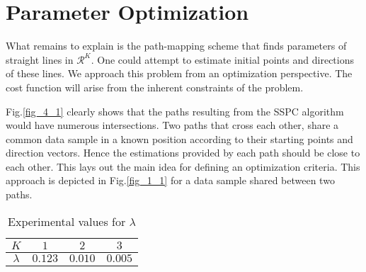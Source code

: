 \documentclass[10pt,journal,cspaper,compsoc]{IEEEtran}
\let\MYoriglatexcaption\caption
\renewcommand{\caption}[2][\relax]{\MYoriglatexcaption[#2]{#2}}
\begin{document}
\section{Parameter Optimization}
What remains to explain is the path-mapping scheme that finds parameters of straight lines in  $\mathcal{R}^K$. One could attempt to estimate initial points and directions of these lines. We approach this problem from an optimization perspective. The cost function will arise from the inherent constraints of the problem. 

Fig.\ref{fig_4_1} clearly shows that the paths resulting from the SSPC algorithm would have numerous intersections. Two paths that cross each other, share a common data sample in a known position according to their starting points and direction vectors. Hence the estimations provided by each path should be close to each other. This lays out the main idea for defining an optimization criteria. This approach is depicted in Fig.\ref{fig_1_1} for a data sample shared between two paths.

\begin{table}[t]
\label{table2}
\caption{Experimental values for $\lambda$}
\begin{center}
\begin{tabular}{| c | c | c | c |}
\hline
$K$ & $1$ & $2$ & $3$\\ \hline
$\lambda$ & $0.123$ & $0.010$ & $0.005$\\ \hline
\end{tabular}
\end{center}
\end{table}
\end{document}
